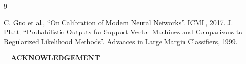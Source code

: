 \documentclass[
  portrait,
  a0paper%
]
{baposter}
\begin{document}
\begin{poster}
{\begin{minipage}[t][3cm]{.32\textwidth}
\begin{thebibliography}{9}
\begin{tiny}
          C. Guo et al., ``On Calibration of Modern Neural Networks''. ICML, 2017.
          J. Platt, ``Probabilistic Outputs for Support Vector Machines and Comparisons to Regularized Likelihood Methods''. Advances in Large Margin Classifiers, 1999.
          \par
        \end{tiny}
      \end{thebibliography}
    \end{minipage}
    \hfill\vline\hfill
    \begin{minipage}[t][3cm]{.32\textwidth}
      \vspace{.3cm}
      $\quad$\textbf{\small\color{cernblue}ACKNOWLEDGEMENT}\\[0.5ex]
      \footnotesize\RaggedRight

\end{minipage}}
\end{poster}
\end{document}
